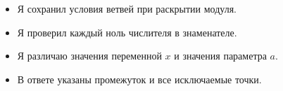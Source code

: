 \begin{selfcheck}
  \begin{itemize}[label=$\square$,leftmargin=1.7em,itemsep=0.25em,topsep=0.2em]
    \item Я сохранил условия ветвей при раскрытии модуля.
    \item Я проверил каждый ноль числителя в знаменателе.
    \item Я различаю значения переменной \(x\) и значения параметра \(a\).
    \item В ответе указаны промежуток и все исключаемые точки.
  \end{itemize}
\end{selfcheck}
